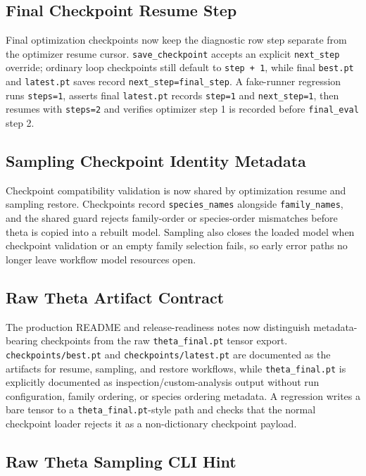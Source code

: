 \documentclass[11pt]{article}
\begin{document}
\subsection{Final Checkpoint Resume Step}

Final optimization checkpoints now keep the diagnostic row step separate from
the optimizer resume cursor.  \texttt{save\_checkpoint} accepts an explicit
\texttt{next\_step} override; ordinary loop checkpoints still default to
\texttt{step + 1}, while final \texttt{best.pt} and \texttt{latest.pt} saves
record \texttt{next\_step=final\_step}.  A fake-runner regression runs
\texttt{steps=1}, asserts final \texttt{latest.pt} records \texttt{step=1} and
\texttt{next\_step=1}, then resumes with \texttt{steps=2} and verifies optimizer
step 1 is recorded before \texttt{final\_eval} step 2.

\subsection{Sampling Checkpoint Identity Metadata}

Checkpoint compatibility validation is now shared by optimization resume and
sampling restore.  Checkpoints record \texttt{species\_names} alongside
\texttt{family\_names}, and the shared guard rejects family-order or
species-order mismatches before theta is copied into a rebuilt model.  Sampling
also closes the loaded model when checkpoint validation or an empty family
selection fails, so early error paths no longer leave workflow model resources
open.

\subsection{Raw Theta Artifact Contract}

The production README and release-readiness notes now distinguish
metadata-bearing checkpoints from the raw \texttt{theta\_final.pt} tensor
export.  \texttt{checkpoints/best.pt} and \texttt{checkpoints/latest.pt} are
documented as the artifacts for resume, sampling, and restore workflows, while
\texttt{theta\_final.pt} is explicitly documented as inspection/custom-analysis
output without run configuration, family ordering, or species ordering metadata.
A regression writes a bare tensor to a \texttt{theta\_final.pt}-style path and
checks that the normal checkpoint loader rejects it as a non-dictionary
checkpoint payload.

\subsection{Raw Theta Sampling CLI Hint}
\end{document}
